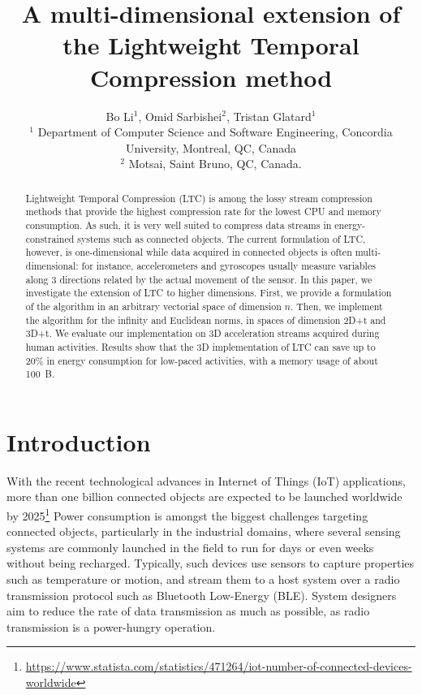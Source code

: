 \documentclass[10pt, conference, compsocconf]{IEEEtran}
\begin{document}
\title{A multi-dimensional extension of the Lightweight Temporal Compression method}

\author{Bo Li$^1$, Omid Sarbishei$^2$, Tristan Glatard$^1$\\
  $^1$ Department of Computer Science and Software Engineering, Concordia University, Montreal, QC, Canada \\
  $^2$ Motsai, Saint Bruno, QC, Canada.}
\maketitle

\begin{abstract}
Lightweight Temporal Compression
(LTC) is among the lossy stream
compression methods that provide the highest compression rate for the 
lowest CPU and memory consumption. As such, it is very well suited to 
compress data streams in energy-constrained systems such as connected 
objects. The current formulation of LTC, however, is one-dimensional 
while data acquired in connected objects is often multi-dimensional: for instance, 
accelerometers and gyroscopes usually measure variables along 
3 directions related by the actual movement of the sensor. In this 
paper, we investigate the extension of LTC to 
higher dimensions. First, we provide a formulation 
of the algorithm in an arbitrary vectorial space of dimension $n$. 
Then, we implement the algorithm for the infinity and Euclidean norms, 
in spaces of dimension 2D+t and 3D+t. We evaluate our implementation on 
3D acceleration streams acquired during human activities. 
Results show that the 3D implementation of LTC can save up to 20\% in 
energy consumption for low-paced activities, with a memory usage of about 100~B.
\end{abstract}

\section{Introduction}

With the recent technological advances in Internet of Things (IoT) 
applications, more than one billion connected objects are expected to 
be launched worldwide by 2025\footnote{\url{ 
https://www.statista.com/statistics/471264/iot-number-of-connected-devices-worldwide}} 
Power consumption is amongst the biggest challenges targeting connected 
objects, particularly in the industrial domains, where several sensing 
systems are commonly launched in the field to run for days or even 
weeks without being recharged. Typically, such devices use sensors to 
capture properties such as temperature or motion, and stream them to a 
host system over a radio transmission protocol such as Bluetooth 
Low-Energy (BLE). System designers aim to reduce the rate of data 
transmission as much as possible, as radio transmission is a 
power-hungry operation.
\end{document}
